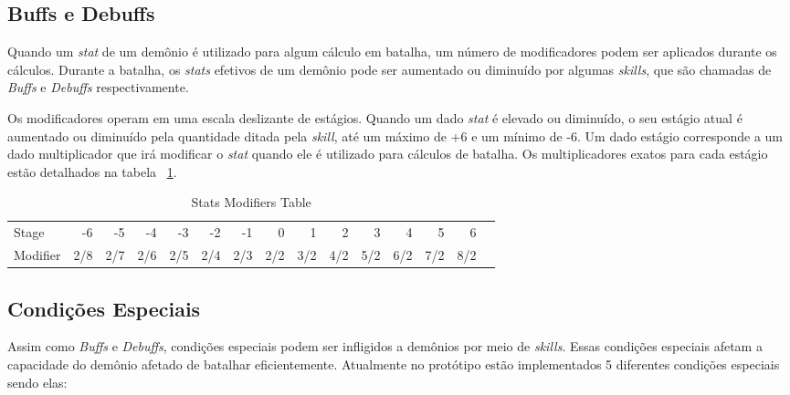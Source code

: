 \documentclass[
	12pt,				%
	openright,			%
	twoside,			%
	a4paper,			%
	english,			%
	french,				%
	spanish,			%
	brazil				%
	]{abntex2}
\begin{document}
\subsection{Buffs e Debuffs}

	Quando um \emph{stat} de um demônio é utilizado para algum cálculo em batalha, um número de modificadores podem ser aplicados durante os cálculos. Durante a batalha, os \emph{stats} efetivos de um demônio pode ser aumentado ou diminuído por algumas \emph{skills}, que são chamadas de \emph{Buffs} e \emph{Debuffs} respectivamente.
	
	Os modificadores operam em uma escala deslizante de estágios. Quando um dado \emph{stat} é elevado ou diminuído, o seu estágio atual é aumentado ou diminuído pela quantidade ditada pela \emph{skill}, até um máximo de +6 e um mínimo de -6. Um dado estágio corresponde a um dado multiplicador que irá modificar o \emph{stat} quando ele é utilizado para cálculos de batalha. Os multiplicadores exatos para cada estágio estão detalhados na tabela ~\ref{tab:stages}.
	
\begin{table}[!htp]\centering
\caption{Stats Modifiers Table}\label{tab:stages}
\scriptsize
\begin{tabular}{lrrrrrrrrrrrrrr}\toprule
Stage &-6 &-5 &-4 &-3 &-2 &-1 &0 &1 &2 &3 &4 &5 &6 \\\cmidrule{1-14}
Modifier &2/8 &2/7 &2/6 &2/5 &2/4 &2/3 &2/2 &3/2 &4/2 &5/2 &6/2 &7/2 &8/2 \\\midrule
\bottomrule
\end{tabular}
\end{table}

\subsection{Condições Especiais}\label{conditions}

	Assim como \emph{Buffs} e \emph{Debuffs}, condições especiais podem ser infligidos a demônios por meio de \emph{skills}. Essas condições especiais afetam a capacidade do demônio afetado de batalhar eficientemente. Atualmente no protótipo estão implementados 5 diferentes condições especiais sendo elas:
\end{document}
